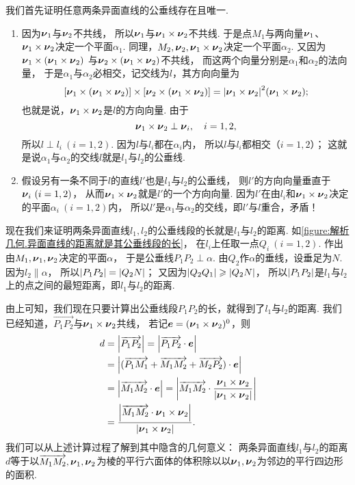 我们首先证明任意两条异面直线的公垂线存在且唯一.
\begin{enumerate}
	\item 因为\(\boldsymbol{\nu}_1\)与\(\boldsymbol{\nu}_2\)不共线，
	所以\(\boldsymbol{\nu}_1\)与\(\boldsymbol{\nu}_1\times\boldsymbol{\nu}_2\)不共线.
	于是点\(M_1\)与两向量\(\boldsymbol{\nu}_1\)、\(\boldsymbol{\nu}_1\times\boldsymbol{\nu}_2\)决定一个平面\(\alpha_1\).
	同理，\(M_2,\boldsymbol{\nu}_2,\boldsymbol{\nu}_1\times\boldsymbol{\nu}_2\)决定一个平面\(\alpha_2\).
	又因为\(\boldsymbol{\nu}_1\times(\boldsymbol{\nu}_1\times\boldsymbol{\nu}_2)\)
	与\(\boldsymbol{\nu}_2\times(\boldsymbol{\nu}_1\times\boldsymbol{\nu}_2)\)不共线，
	而这两个向量分别是\(\alpha_1\)和\(\alpha_2\)的法向量，
	于是\(\alpha_1\)与\(\alpha_2\)必相交，记交线为\(l\)，其方向向量为\[
		[\boldsymbol{\nu}_1\times(\boldsymbol{\nu}_1\times\boldsymbol{\nu}_2)]
		\times[\boldsymbol{\nu}_2\times(\boldsymbol{\nu}_1\times\boldsymbol{\nu}_2)]
		= \abs{\boldsymbol{\nu}_1\times\boldsymbol{\nu}_2}^2(\boldsymbol{\nu}_1\times\boldsymbol{\nu}_2);
	\]
	也就是说，\(\boldsymbol{\nu}_1\times\boldsymbol{\nu}_2\)是\(l\)的方向向量.
	由于\[
		\boldsymbol{\nu}_1\times\boldsymbol{\nu}_2 \perp \boldsymbol{\nu}_i,
		\quad i=1,2,
	\]
	所以\(l \perp l_i\ (i=1,2)\).
	因为\(l\)与\(l_i\)都在\(\alpha_i\)内，
	所以\(l\)与\(l_i\)都相交（\(i=1,2\)）；
	这就是说\(\alpha_1\)与\(\alpha_2\)的交线\(l\)就是\(l_1\)与\(l_2\)的公垂线.

	\item 假设另有一条不同于\(l\)的直线\(l'\)也是\(l_1\)与\(l_2\)的公垂线，
	则\(l'\)的方向向量垂直于\(\boldsymbol{\nu}_i\ (i=1,2)\)，
	从而\(\boldsymbol{\nu}_1\times\boldsymbol{\nu}_2\)就是\(l'\)的一个方向向量.
	因为\(l'\)在由\(l_i\)和\(\boldsymbol{\nu}_1\times\boldsymbol{\nu}_2\)决定的平面\(\alpha_i\ (i=1,2)\)内，
	所以\(l'\)是\(\alpha_1\)与\(\alpha_2\)的交线，即\(l'\)与\(l\)重合，矛盾！
\end{enumerate}

现在我们来证明两条异面直线\(l_1,l_2\)的公垂线段的长就是\(l_1\)与\(l_2\)的距离.
如\cref{figure:解析几何.异面直线的距离就是其公垂线段的长}，
在\(l_i\)上任取一点\(Q_i\ (i=1,2)\).
作出由\(M_1,\boldsymbol{\nu}_1,\boldsymbol{\nu}_2\)决定的平面\(\alpha\)，
于是公垂线\(P_1 P_2 \perp \alpha\).
由\(Q_2\)作\(\alpha\)的垂线，设垂足为\(N\).
因为\(l_2 \parallel \alpha\)，
所以\(\abs{P_1 P_2} = \abs{Q_2 N}\)；
又因为\(\abs{Q_2 Q_1} \geqslant \abs{Q_2 N}\)，
所以\(\abs{P_1 P_2}\)是\(l_1\)与\(l_2\)上的点之间的最短距离，即\(l_1\)与\(l_2\)的距离.

由上可知，我们现在只要计算出公垂线段\(P_1 P_2\)的长，就得到了\(l_1\)与\(l_2\)的距离.
我们已经知道，\(\vec{P_1 P_2}\)与\(\boldsymbol{\nu}_1\times\boldsymbol{\nu}_2\)共线，
若记\(\boldsymbol{e} = (\boldsymbol{\nu}_1\times\boldsymbol{\nu}_2)^0\)，则\begin{align*}
	d &= \abs{\overrightarrow{P_1 P_2}}
	= \abs{\overrightarrow{P_1 P_2} \cdot \boldsymbol{e}} \\
	&= \abs{(\overrightarrow{P_1 M_1} + \overrightarrow{M_1 M_2} + \overrightarrow{M_2 P_2}) \cdot \boldsymbol{e}} \\
	&= \abs{\overrightarrow{M_1 M_2} \cdot \boldsymbol{e}}
	= \abs{\overrightarrow{M_1 M_2} \cdot \frac{\boldsymbol{\nu}_1\times\boldsymbol{\nu}_2}{\abs{\boldsymbol{\nu}_1\times\boldsymbol{\nu}_2}}} \\
	&= \frac{\abs{\overrightarrow{M_1 M_2} \cdot \boldsymbol{\nu}_1\times\boldsymbol{\nu}_2}}{\abs{\boldsymbol{\nu}_1\times\boldsymbol{\nu}_2}}.
\end{align*}
我们可以从上述计算过程了解到其中隐含的几何意义：
两条异面直线\(l_1\)与\(l_2\)的距离\(d\)等于以\(\overrightarrow{M_1 M_2},\boldsymbol{\nu}_1,\boldsymbol{\nu}_2\)为棱的平行六面体的体积除以以\(\boldsymbol{\nu}_1,\boldsymbol{\nu}_2\)为邻边的平行四边形的面积.

